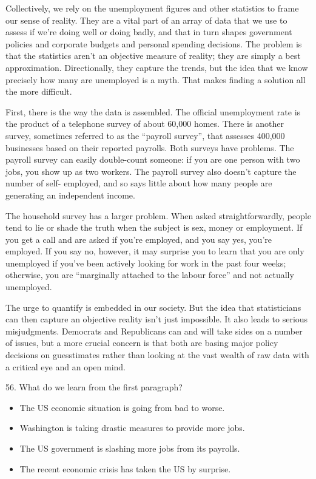 \documentclass[UTF8,11pt]{ctexart}
\begin{document}
Collectively, we rely on the unemployment figures and other statistics to frame our sense of reality. They are a vital part of an array of data that we use to assess if we’re doing well or doing badly, and that in turn shapes government policies and corporate budgets and personal spending decisions. The problem is that the statistics aren’t an objective measure of reality; they are simply a best approximation. Directionally, they capture the trends, but the idea that we know precisely how many are unemployed is a myth. That makes finding a solution all the more difficult.


First, there is the way the data is assembled. The official unemployment rate is the product of a telephone survey of about 60,000 homes. There is another survey, sometimes referred to as the “payroll survey”, that assesses 400,000 businesses based on their reported payrolls. Both surveys have problems. The payroll survey can easily double-count someone: if you are one person with two jobs, you show up as two workers. The payroll survey also doesn’t capture the number of self- employed, and so says little about how many people are generating an independent income.


The household survey has a larger problem. When asked straightforwardly, people tend to lie or shade the truth when the subject is sex, money or employment. If you get a call and are asked if you’re employed, and you say yes, you’re employed. If you say no, however, it may surprise you to learn that you are only unemployed if you’ve been actively looking for work in the past four weeks; otherwise, you are “marginally attached to the labour force” and not actually unemployed.


The urge to quantify is embedded in our society. But the idea that statisticians can then capture an objective reality isn’t just impossible. It also leads to serious misjudgments. Democrats and Republicans can and will take sides on a number of issues, but a more crucial concern is that both are basing major policy decisions on guesstimates rather than looking at the vast wealth of raw data with a critical eye and an open mind.


56. What do we learn from the first paragraph?


\begin{itemize}[leftmargin=2em,itemsep=.2em,topsep=.4em]\item[A.] The US economic situation is going from bad to worse.
\item[B.] Washington is taking drastic measures to provide more jobs.
\item[C.] The US government is slashing more jobs from its payrolls.
\item[D.] The recent economic crisis has taken the US by surprise.
\end{itemize}
\end{document}
